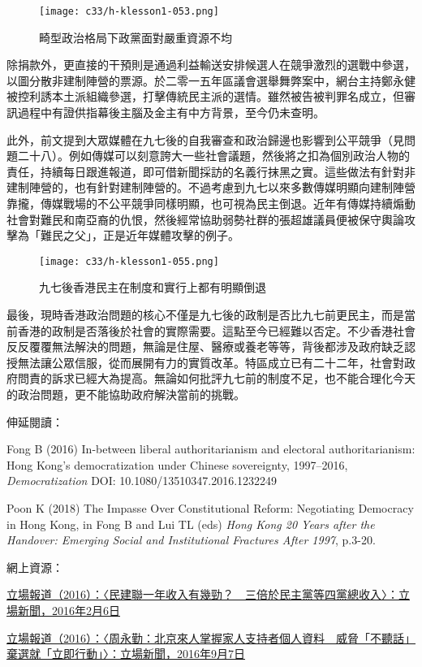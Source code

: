 \begin{figure}[htbp]
    \centering
    \texttt{[image: c33/h-klesson1-053.png]}
    \caption{畸型政治格局下政黨面對嚴重資源不均} 
\end{figure}

除捐款外，更直接的干預則是通過利益輸送安排候選人在競爭激烈的選戰中參選，以圖分散非建制陣營的票源。於二零一五年區議會選舉舞弊案中，網台主持鄭永健被控利誘本土派組織參選，打擊傳統民主派的選情。雖然被告被判罪名成立，但審訊過程中有證供指幕後主腦及金主有中方背景，至今仍未查明。

此外，前文提到大眾媒體在九七後的自我審查和政治歸邊也影響到公平競爭（見問題二十八）。例如傳媒可以刻意誇大一些社會議題，然後將之扣為個別政治人物的責任，持續每日跟進報道，即可借新聞採訪的名義行抹黑之實。這些做法有針對非建制陣營的，也有針對建制陣營的。不過考慮到九七以來多數傳媒明顯向建制陣營靠攏，傳媒戰場的不公平競爭同樣明顯，也可視為民主倒退。近年有傳媒持續煽動社會對難民和南亞裔的仇恨，然後經常協助弱勢社群的張超雄議員便被保守輿論攻擊為「難民之父」，正是近年媒體攻擊的例子。

\begin{figure}[htbp]
    \centering
    \texttt{[image: c33/h-klesson1-055.png]}
    \caption{九七後香港民主在制度和實行上都有明顯倒退} 
\end{figure}

最後，現時香港政治問題的核心不僅是九七後的政制是否比九七前更民主，而是當前香港的政制是否落後於社會的實際需要。這點至今已經難以否定。不少香港社會反反覆覆無法解決的問題，無論是住屋、醫療或養老等等，背後都涉及政府缺乏認授無法讓公眾信服，從而展開有力的實質改革。特區成立已有二十二年，社會對政府問責的訴求已經大為提高。無論如何批評九七前的制度不足，也不能合理化今天的政治問題，更不能協助政府解決當前的挑戰。

伸延閱讀：

Fong B (2016) In-between liberal authoritarianism and electoral authoritarianism: Hong Kong’s democratization under Chinese sovereignty, 1997–2016, \textit{Democratization} DOI: 10.1080/13510347.2016.1232249

Poon K (2018) The Impasse Over Constitutional Reform: Negotiating Democracy in Hong Kong, in Fong B and Lui TL (eds) \textit{Hong Kong 20 Years after the Handover: Emerging Social and Institutional Fractures After 1997}, p.3-20.

網上資源：

\href{https://thestandnews.com/politics/政黨財力比恲-民建聯一年收入有幾勁-三倍於民主黨等四黨總收入/}{立場報道（2016）：〈民建聯一年收入有幾勁？　三倍於民主黨等四黨總收入〉：立場新聞，2016年2月6日}

\href{https://www.thestandnews.com/politics/周永勤-北京來人說出多名支持者個人資料-威脅-不聽話-棄選就-立即行動/}{立場報道（2016）：〈周永勤：北京來人掌握家人支持者個人資料　威脅「不聽話」棄選就「立即行動」〉：立場新聞，2016年9月7日}